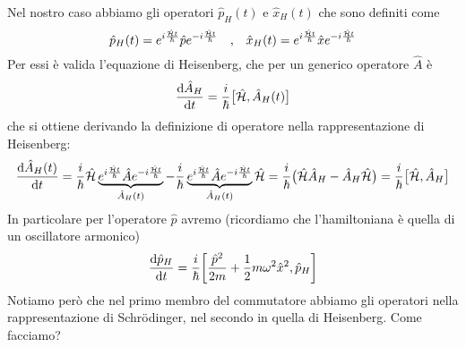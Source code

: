 \begin{soluzione}
   Nel nostro caso abbiamo gli operatori $\hat{p}_H(t)$ e $\hat{x}_H(t)$ che sono definiti come
   \begin{equation*}
      \hat{p}_H(t)=e^{i\frac{\hat{\mathcal{H}} t}{\hbar}} \hat{p} e^{-i\frac{\hat{\mathcal{H}} t}{\hbar}}
      \qqtext{,}
      \hat{x}_H(t)=e^{i\frac{\hat{\mathcal{H}} t}{\hbar}} \hat{x} e^{-i\frac{\hat{\mathcal{H}} t}{\hbar}}
   \end{equation*}
   Per essi è valida l'equazione di Heisenberg, che per un generico operatore $\hat{A}$ è
   \begin{equation*}
      \dv{\hat{A}_H}{t}=\frac{i}{\hbar} \bigl[ \hat{\mathcal{H}}, \hat{A}_H(t) \bigr]
   \end{equation*}
   che si ottiene derivando la definizione di operatore nella rappresentazione di Heisenberg:
   \begin{equation*}
      \dv{\hat{A}_H(t)}{t}
      =\frac{i}{\hbar}\hat{\mathcal{H}} \underbrace{e^{i\frac{\hat{\mathcal{H}} t}{\hbar}} \hat{A} e^{-i\frac{\hat{\mathcal{H}} t}{\hbar}}}_{\hat{A}_H(t)}
      - \frac{i}{\hbar} \underbrace{e^{i\frac{\hat{\mathcal{H}} t}{\hbar}} \hat{A} e^{-i\frac{\hat{\mathcal{H}} t}{\hbar}}}_{\hat{A}_H(t)} \hat{\mathcal{H}}
      =\frac{i}{\hbar} \bigl( \hat{\mathcal{H}}\hat{A}_H - \hat{A}_H\hat{\mathcal{H}} \bigr)
      =\frac{i}{\hbar} \big[ \hat{\mathcal{H}}, \hat{A}_H \big]
   \end{equation*}
   In particolare per l'operatore $\hat{p}$ avremo (ricordiamo che l'hamiltoniana è quella di un oscillatore armonico)
   \begin{equation*}
      \dv{\hat{p}_H}{t}=\frac{i}{\hbar} \qty[ \frac{\hat{p}^2}{2m} + \frac{1}{2} m \omega^2 \hat{x}^2, \hat{p}_H ]
   \end{equation*}
   Notiamo però che nel primo membro del commutatore abbiamo gli operatori nella rappresentazione di Schrödinger, nel secondo in quella di Heisenberg. Come facciamo?


\end{soluzione}
